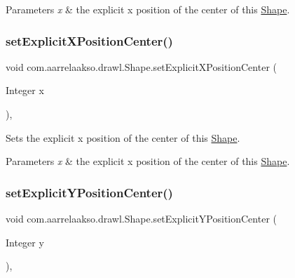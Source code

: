 \begin{DoxyParams}{Parameters}
{\em x} & the explicit x position of the center of this \hyperlink{classcom_1_1aarrelaakso_1_1drawl_1_1_shape}{Shape}. \\
\hline
\end{DoxyParams}
\mbox{\label{classcom_1_1aarrelaakso_1_1drawl_1_1_shape_aa7855df6d98b3bfa556b7d857755181b}} 
\subsubsection{\texorpdfstring{set\+Explicit\+X\+Position\+Center()}{setExplicitXPositionCenter()}\hspace{0.1cm}{\footnotesize\ttfamily [2/2]}}
{\footnotesize\ttfamily void com.\+aarrelaakso.\+drawl.\+Shape.\+set\+Explicit\+X\+Position\+Center (\begin{DoxyParamCaption}\item[{Integer}]{x }\end{DoxyParamCaption})\hspace{0.3cm}{\ttfamily [protected]}, {\ttfamily [inherited]}}



Sets the explicit x position of the center of this \hyperlink{classcom_1_1aarrelaakso_1_1drawl_1_1_shape}{Shape}. 


\begin{DoxyParams}{Parameters}
{\em x} & the explicit x position of the center of this \hyperlink{classcom_1_1aarrelaakso_1_1drawl_1_1_shape}{Shape}. \\
\hline
\end{DoxyParams}
\mbox{\label{classcom_1_1aarrelaakso_1_1drawl_1_1_shape_a947c00be2ea3d0e732814b8ca377df45}} 
\subsubsection{\texorpdfstring{set\+Explicit\+Y\+Position\+Center()}{setExplicitYPositionCenter()}\hspace{0.1cm}{\footnotesize\ttfamily [1/2]}}
{\footnotesize\ttfamily void com.\+aarrelaakso.\+drawl.\+Shape.\+set\+Explicit\+Y\+Position\+Center (\begin{DoxyParamCaption}\item[{Integer}]{y }\end{DoxyParamCaption})\hspace{0.3cm}{\ttfamily [protected]}, {\ttfamily [inherited]}}

